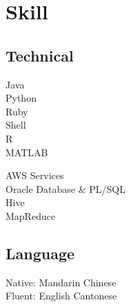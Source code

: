 \documentclass[]{deedy-resume-openfont}
\begin{document}
\begin{minipage}[t]{0.35\textwidth}

\section{Skill}
\subsection{Technical}
\minigap
{}
Java \\
Python \\
Ruby \\
Shell \\
R \\
MATLAB
\minigap

AWS Services \\
Oracle Database \& PL/SQL \\
Hive \\
MapReduce
\sectionsep

\subsection{Language}
Native: Mandarin Chinese \\
Fluent: English \textbullet{} Cantonese


%
%

\end{minipage} 
\hfill
\end{document}
